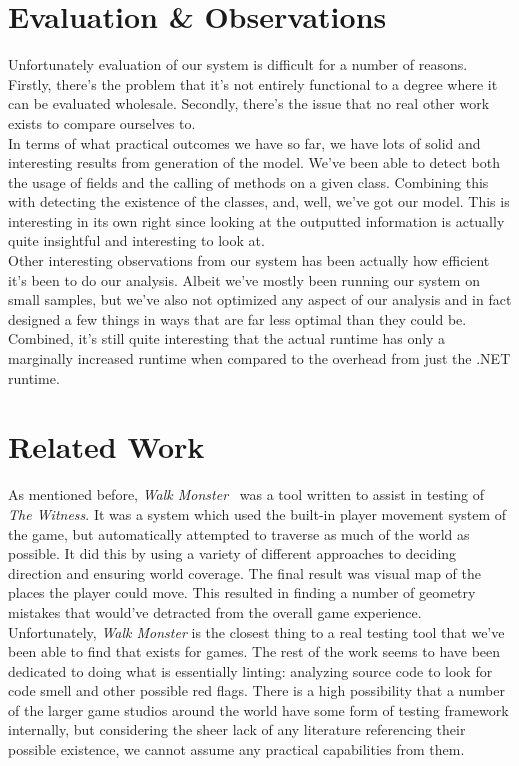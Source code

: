 \documentclass[letterpaper,twocolumn,10pt]{article}
\begin{document}
\section{Evaluation \& Observations}

Unfortunately evaluation of our system is difficult for a number of reasons. Firstly, there's the problem that it's not entirely functional to a degree where it can be evaluated wholesale. Secondly, there's the issue that no real other work exists to compare ourselves to. \\

In terms of what practical outcomes we have so far, we have lots of solid and interesting results from generation of the model. We've been able to detect both the usage of fields and the calling of methods on a given class. Combining this with detecting the existence of the classes, and, well, we've got our model. This is interesting in its own right since looking at the outputted information is actually quite insightful and interesting to look at. \\

Other interesting observations from our system has been actually how efficient it's been to do our analysis. Albeit we've mostly been running our system on small samples, but we've also not optimized any aspect of our analysis and in fact designed a few things in ways that are far less optimal than they could be. Combined, it's still quite interesting that the actual runtime has only a marginally increased runtime when compared to the overhead from just the .NET runtime. \\

\section{Related Work}

As mentioned before, \textit{Walk Monster}~\cite{WalkMonster} was a tool written to assist in testing of \textit{The Witness}. It was a system which used the built-in player movement system of the game, but automatically attempted to traverse as much of the world as possible. It did this by using a variety of different approaches to deciding direction and ensuring world coverage. The final result was visual map of the places the player could move. This resulted in finding a number of geometry mistakes that would've detracted from the overall game experience.\\

Unfortunately, \textit{Walk Monster} is the closest thing to a real testing tool that we've been able to find that exists for games. The rest of the work seems to have been dedicated to doing what is essentially linting: analyzing source code to look for code smell and other possible red flags. There is a high possibility that a number of the larger game studios around the world have some form of testing framework internally, but considering the sheer lack of any literature referencing their possible existence, we cannot assume any practical capabilities from them.\\
\end{document}
